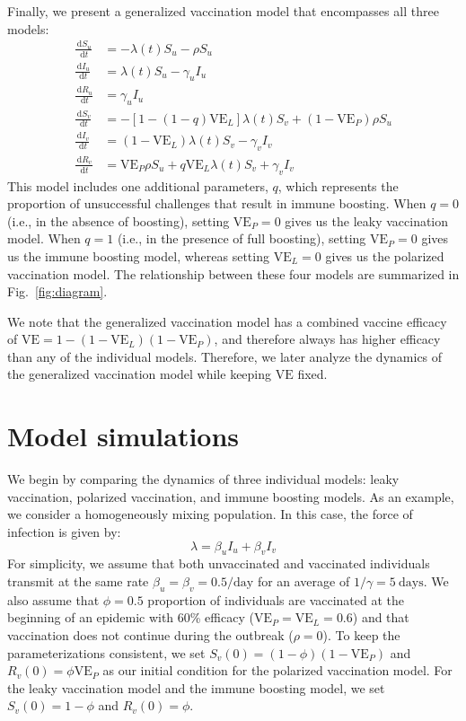 \documentclass[12pt]{article}
\newcommand{\fref}[1]{Fig.~\ref{fig:#1}}
\newcommand{\dd}[1]{\ensuremath{\, \mathrm{d}#1}}
\newcommand{\VE}{\ensuremath{\textrm{VE}}}
\begin{document}
Finally, we present a generalized vaccination model that encompasses all three models:
\begin{align}
\frac{\dd S_u}{\dd t} &= - \lambda(t) S_u - \rho S_u \\
\frac{\dd I_u}{\dd t} &= \lambda(t) S_u - \gamma_u I_u \\
\frac{\dd R_u}{\dd t} &= \gamma_u I_u \\
\frac{\dd S_v}{\dd t} &= - [1- (1-q) \VE_L] \lambda(t) S_v + (1-\VE_P) \rho S_u \\
\frac{\dd I_v}{\dd t} &= (1-\VE_L) \lambda(t) S_v - \gamma_v I_v \\
\frac{\dd R_v}{\dd t} &= \VE_P \rho S_u + q \VE_L \lambda(t) S_v + \gamma_v I_v
\end{align}
This model includes one additional parameters, $q$, which represents the proportion of unsuccessful challenges that result in immune boosting.
When $q=0$ (i.e., in the absence of boosting), setting $\VE_P = 0$ gives us the leaky vaccination model. 
When $q=1$ (i.e., in the presence of full boosting), setting $\VE_P = 0$ gives us the immune boosting model, whereas setting $\VE_L = 0$ gives us the polarized vaccination model. 
The relationship between these four models are summarized in \fref{diagram}.

We note that the generalized vaccination model has a combined vaccine efficacy of $\VE = 1- (1-\VE_L) (1-\VE_P)$, and therefore always has higher efficacy than any of the individual models.
Therefore, we later analyze the dynamics of the generalized vaccination model while keeping $\VE$ fixed.

\section*{Model simulations}

We begin by comparing the dynamics of three individual models: leaky vaccination, polarized vaccination, and immune boosting models.
As an example, we consider a homogeneously mixing population. In this case, the force of infection is given by:
\begin{equation}
\lambda = \beta_u I_u + \beta_v I_v
\end{equation}
For simplicity, we assume that both unvaccinated and vaccinated individuals transmit at the same rate $\beta_u = \beta_v =0.5/\mathrm{day}$ for an average of $1/\gamma=5~\mathrm{days}$.
We also assume that $\phi = 0.5$ proportion of individuals are vaccinated at the beginning of an epidemic with 60\% efficacy ($\VE_P=\VE_L=0.6$) and that vaccination does not continue during the outbreak ($\rho = 0$).
To keep the parameterizations consistent, we set $S_v(0) = (1-\phi) (1-\VE_P)$ and $R_v(0) = \phi \VE_P$ as our initial condition for the polarized vaccination model.
For the leaky vaccination model and the immune boosting model, we set $S_v(0) = 1-\phi$ and $R_v(0) = \phi$.
\end{document}
